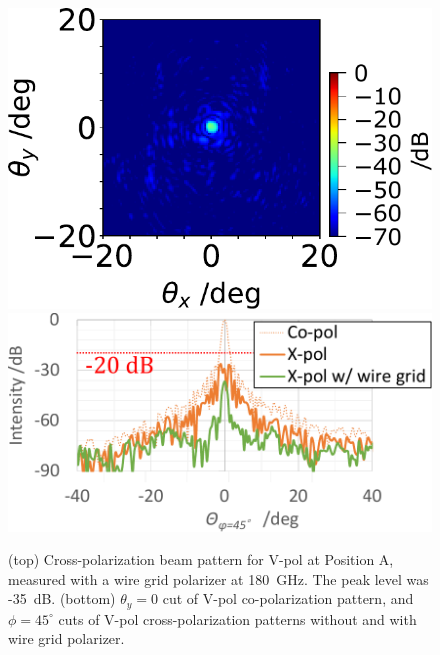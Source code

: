 \documentclass[journal]{IEEEtran}
\begin{document}
\begin{figure}[!t]
\centering
\includegraphics[width=0.7\linewidth]{Figures/HVpol_Xpol_180G_wiregrid.pdf}
\hfil
\includegraphics[width=0.9\linewidth]{Figures/HVpol_Xpol_180G_cut.pdf}
\caption{%
(top) Cross-polarization beam pattern for V-pol at Position A, measured with a wire grid polarizer at 180~GHz. The peak level was -35~dB.
(bottom) $\theta_y = 0$ cut of V-pol co-polarization pattern, and $\phi = 45^\circ$ cuts of V-pol cross-polarization patterns without and with wire grid polarizer.
}
\label{fig:HVpol_Xpol_180G_wiregrid}
\end{figure}
%
%
\end{document}
